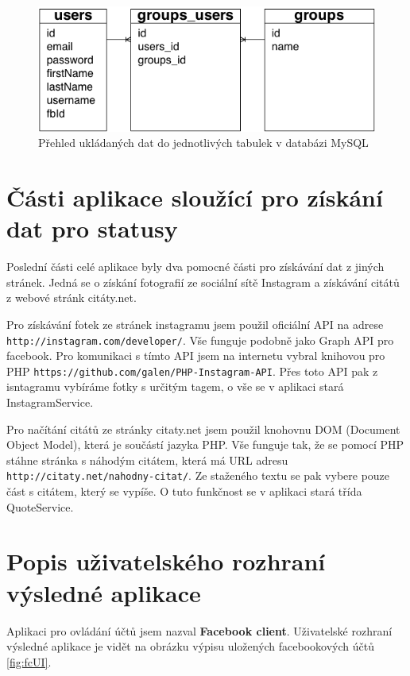 \documentclass[thesis=M,czech]{FITthesis}[2013/05/10]
\begin{document}
\begin{figure}[h]
\begin{center}
\includegraphics[width=5in]{figures/mysqlDataModel.png}
\caption{Přehled ukládaných dat do jednotlivých tabulek v databázi MySQL}
\label{fig:mysqlDataModel}
\end{center}
\end{figure}

\section{Části aplikace sloužící pro získání dat pro statusy}

Poslední části celé aplikace byly dva pomocné části pro získávání dat z jiných stránek. Jedná se o získání fotografií ze sociální sítě Instagram a získávání citátů z webové stránk citáty.net.

Pro získávání fotek ze stránek instagramu jsem použil oficiální API na adrese \verb|http://instagram.com/developer/|. Vše funguje podobně jako Graph API pro facebook. Pro komunikaci s tímto API jsem na internetu vybral knihovou pro PHP \verb|https://github.com/galen/PHP-Instagram-API|. Přes toto API pak z isntagramu vybíráme fotky s určitým tagem, o vše se v aplikaci stará InstagramService.

Pro načítání citátů ze stránky citaty.net jsem použil knohovnu DOM (Document Object Model), která je součástí jazyka PHP. Vše funguje tak, že se pomocí PHP stáhne stránka s náhodým citátem, která má URL adresu \verb|http://citaty.net/nahodny-citat/|. Ze staženého textu se pak vybere pouze část s citátem, který se vypíše. O tuto funkčnost se v aplikaci stará třída QuoteService.


\section{Popis uživatelského rozhraní výsledné aplikace}

Aplikaci pro ovládání účtů jsem nazval \textbf{Facebook client}. Uživatelské rozhraní výsledné aplikace je vidět na obrázku výpisu uložených facebookových účtů \ref{fig:fcUI}.
\end{document}
